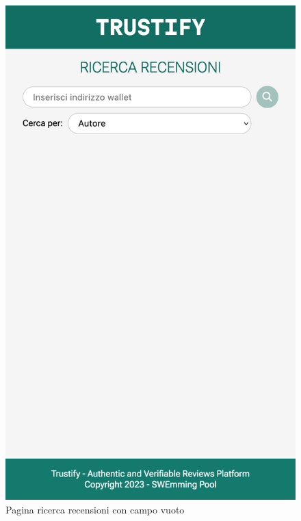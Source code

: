 \begin{figure}
      \includegraphics[scale=0.15]{src/img/ricerca_recensioni.png}
      \caption{Pagina ricerca recensioni con campo vuoto}\label{fig:ricerca_recensioni}
    \endminipage\hfill

\end{figure}
